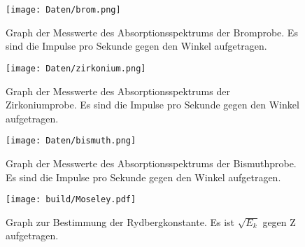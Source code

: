 \begin{figure}
  \centering
  \texttt{[image: Daten/brom.png]}
  \caption{Graph der Messwerte des Absorptionsspektrums der Bromprobe. Es
  sind die Impulse pro Sekunde gegen den Winkel aufgetragen.}
  \label{fig:brom}
\end{figure}

\begin{figure}
  \centering
  \texttt{[image: Daten/zirkonium.png]}
  \caption{Graph der Messwerte des Absorptionsspektrums der Zirkoniumprobe. Es
  sind die Impulse pro Sekunde gegen den Winkel aufgetragen.}
  \label{fig:zirkonium}
\end{figure}

\begin{figure}
  \centering
  \texttt{[image: Daten/bismuth.png]}
  \caption{Graph der Messwerte des Absorptionsspektrums der Bismuthprobe. Es
  sind die Impulse pro Sekunde gegen den Winkel aufgetragen.}
  \label{fig:bismuth}
\end{figure}

\begin{figure}
  \centering
  \texttt{[image: build/Moseley.pdf]}
  \caption{Graph zur Bestimmung der Rydbergkonstante. Es ist $\sqrt{E_k}$ gegen
  Z aufgetragen.}
  \label{fig:moseley}
\end{figure}
